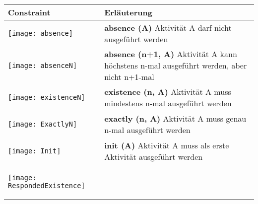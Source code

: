  \begin{longtable}{|p{}|p{}|}
\hline
\textbf{Constraint} & \textbf{Erläuterung}\\
\hline
\begin{center}
  \texttt{[image: absence]} %
  \end{center}
& \textbf{absence (A)} \newline
Aktivität A darf nicht ausgeführt werden\\



\hline
\begin{center}

  \texttt{[image: absenceN]} %
    \end{center}

& \textbf{absence (n+1, A)} \newline
Aktivität A kann höchstens n-mal ausgeführt werden, aber nicht n+1-mal\\
\hline
\begin{center}

  \texttt{[image: existenceN]} %
    \end{center}

& \textbf{existence (n, A)}\newline
Aktivität A muss mindestens n-mal ausgeführt werden\\
\hline
\begin{center}

  \texttt{[image: ExactlyN]} %
    \end{center}

& \textbf{exactly (n, A)}\newline
Aktivität A muss genau n-mal ausgeführt werden\\
\hline

\begin{center}

  \texttt{[image: Init]} %
    \end{center}

& \textbf{init (A)}\newline
Aktivität A muss als erste Aktivität ausgeführt werden\\
\hline


\begin{center}

  \texttt{[image: RespondedExistence]} %
    \end{center}&


\end{longtable}
